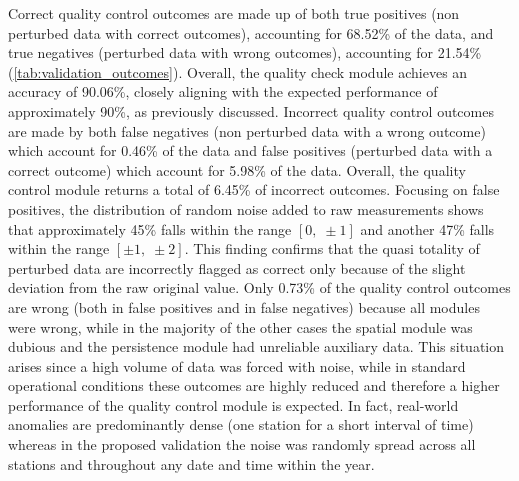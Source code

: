 \documentclass[authoryear,preprint,review,12pt]{elsarticle}
\begin{document}
Correct quality control outcomes are made up of both true positives (non perturbed data with correct outcomes), accounting for 68.52\% of the data, and true negatives (perturbed data with wrong outcomes), accounting for 21.54\% (\cref{tab:validation_outcomes}). 
Overall, the quality check module achieves an accuracy of 90.06\%, closely aligning with the expected performance of approximately 90\%, as previously discussed.
Incorrect quality control outcomes are made by both false negatives (non perturbed data with a wrong outcome) which account for 0.46\% of the data and false positives (perturbed data with a correct outcome) which account for 5.98\% of the data. 
Overall, the quality control module returns a total of 6.45\% of incorrect outcomes. 
Focusing on false positives, the distribution of random noise added to raw measurements shows that approximately 45\% falls within the range $[0,\; \pm1]$ and another 47\% falls within the range $[\pm1,\; \pm2]$. 
This finding confirms that the quasi totality of perturbed data are incorrectly flagged as correct only because of the slight deviation from the raw original value.
Only 0.73\% of the quality control outcomes are wrong (both in false positives and in false negatives) because all modules were wrong, while in the majority of the other cases the spatial module was dubious and the persistence module had unreliable auxiliary data.
This situation arises since a high volume of data was forced with noise, while in standard operational conditions these outcomes are highly reduced and therefore a higher performance of the quality control module is expected.
In fact, real-world anomalies are predominantly dense (one station for a short interval of time) whereas in the proposed validation the noise was randomly spread across all stations and throughout any date and time within the year. 
\end{document}
